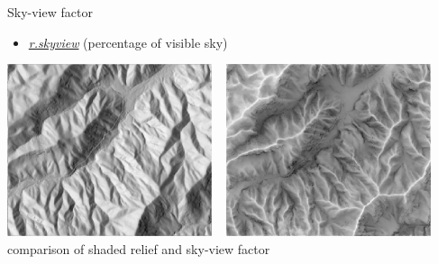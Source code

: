 \documentclass[xcolor={dvipsnames,usenames},beamer,aspectratio=169]{beamer}
\newcommand{\amodule}[1]{\href{http://grass.osgeo.org/grass70/manuals/addons/#1.html}{\emph{#1}}}
\begin{document}
\begin{frame}{Sky-view factor}

\begin{itemize}
  \item \amodule{r.skyview} (percentage of visible sky)
\end{itemize}

\begin{center}
  \includegraphics[width=0.45\textwidth]{vis/shade}
  ~
  \includegraphics[width=0.45\textwidth]{vis/skyview_ridges}
  \\
  {\footnotesize comparison of shaded relief and sky-view factor}
\end{center}

\end{frame}
\end{document}
